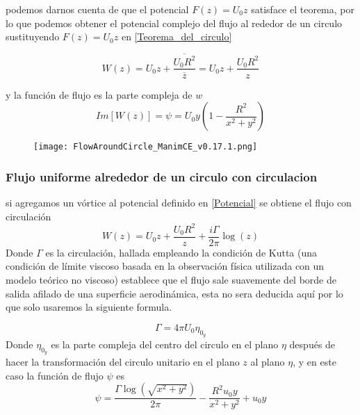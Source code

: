 \documentclass[12pt]{article}
\begin{document}
		podemos darnos cuenta de que el potencial $F(z)= U_0 z$ satisface el teorema, por lo que podemos obtener el potencial complejo  del flujo al rededor de un circulo sustituyendo $F(z)= U_0 z$ en \ref*{Teorema_del_circulo} 

		\begin{equation}
			W(z) = U_0 z + \frac{\overline{U_0 R^2} }{\overline{z} } = U_0 z +\frac{U_0 R^2}{z} 
		\end{equation}

		y la función de flujo es la parte compleja de $w$
		\begin{equation}
			Im[W(z)]=\psi =  U_0 y \left( 1- \frac{R^2}{x^2 + y^2}\right)
			\label{Potencial}
		\end{equation}
		

		\begin{figure}[!h]
			\begin{small}
				\begin{center}
					\texttt{[image: FlowAroundCircle\_ManimCE\_v0.17.1.png]}
				\end{center}
				\caption{}
				\label{fig:}
			\end{small}
		\end{figure}
		
		\subsubsection{Flujo uniforme alrededor de un circulo con circulacion}
			si agregamos un vórtice al potencial definido en \ref{Potencial} se obtiene el flujo con circulación
			\begin{equation}
				W(z) = U_0z + \frac{ U_0R^2}{z} + \frac{i \Gamma}{2 \pi}\log (z)
			\end{equation}
			Donde  $\Gamma$ es la circulación, hallada empleando la condición de Kutta (una condición de límite viscoso basada en la observación física utilizada con un modelo teórico no viscoso) establece que el flujo sale suavemente del borde de salida afilado de una superficie aerodinámica, esta no sera deducida aquí por lo que solo usaremos la siguiente formula.

			\begin{equation}
				\Gamma=4 \pi U_0 \eta_{0_y}
				\label{eq:}
			\end{equation}
			Donde $\eta_{0_y}$ es la parte compleja del centro del circulo en el plano $\eta$ después de hacer la transformación del circulo unitario en el plano $z$ al plano $\eta$, y en este caso la función de flujo $ \psi $ es 
			\begin{equation}
				\psi = \frac{\Gamma \log{\left(\sqrt{x^{2} + y^{2}} \right)}}{2 \pi} - \frac{R^{2} u_{0} y}{x^{2} + y^{2}} + u_{0} y
			\end{equation}
\end{document}
